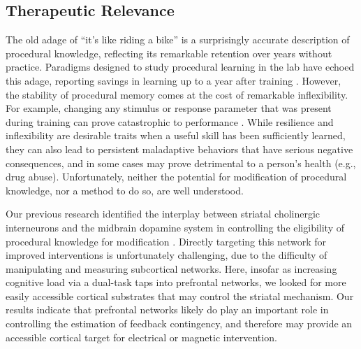 \documentclass[apacite,draftfirst,man]{apa6}
\begin{document}

\subsection*{Therapeutic Relevance}
The old adage of ``it's like riding a bike'' is a surprisingly accurate
description of procedural knowledge, reflecting its remarkable retention over
years without practice. Paradigms designed to study procedural learning in the
lab have echoed this adage, reporting savings in learning up to a year after
training \cite{Romano2010, turner_long-term_2012}. However, the stability of
procedural memory comes at the cost of remarkable inflexibility. For example,
changing any stimulus or response parameter that was present during training can
prove catastrophic to performance \cite{Rozanov_2010, Dienes_1997}. While
resilience and inflexibility are desirable traits when a useful skill has been
sufficiently learned, they can also lead to persistent maladaptive behaviors
that have serious negative consequences, and in some cases may prove detrimental
to a person's health (e.g., drug abuse). Unfortunately, neither the potential
for modification of procedural knowledge, nor a method to do so, are well
understood.

Our previous research identified the interplay between striatal cholinergic
interneurons and the midbrain dopamine system in controlling the eligibility of
procedural knowledge for modification \cite{AshbyCrossley2011,
crossley_erasing_2013}. Directly targeting this network for improved
interventions is unfortunately challenging, due to the difficulty of
manipulating and measuring subcortical networks. Here, insofar as increasing
cognitive load via a dual-task taps into prefrontal networks, we looked for more
easily accessible cortical substrates that may control the striatal mechanism.
Our results indicate that prefrontal networks likely do play an important role
in controlling the estimation of feedback contingency, and therefore may provide
an accessible cortical target for electrical or magnetic intervention.


\end{document}
